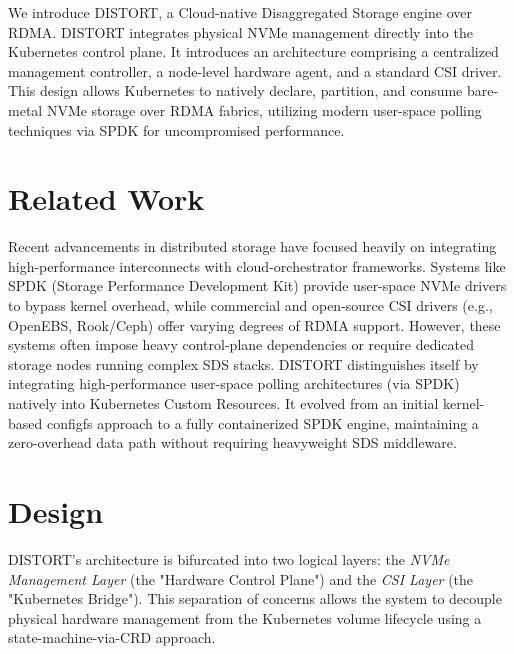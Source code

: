 \documentclass[sigconf]{acmart}
\begin{document}
We introduce DISTORT, a Cloud-native Disaggregated Storage engine over RDMA. DISTORT integrates physical NVMe management directly into the Kubernetes control plane. It introduces an architecture comprising a centralized management controller, a node-level hardware agent, and a standard CSI driver. This design allows Kubernetes to natively declare, partition, and consume bare-metal NVMe storage over RDMA fabrics, utilizing modern user-space polling techniques via SPDK for uncompromised performance.

\section{Related Work}
Recent advancements in distributed storage have focused heavily on integrating high-performance interconnects with cloud-orchestrator frameworks. Systems like SPDK (Storage Performance Development Kit) provide user-space NVMe drivers to bypass kernel overhead, while commercial and open-source CSI drivers (e.g., OpenEBS, Rook/Ceph) offer varying degrees of RDMA support. However, these systems often impose heavy control-plane dependencies or require dedicated storage nodes running complex SDS stacks. DISTORT distinguishes itself by integrating high-performance user-space polling architectures (via SPDK) natively into Kubernetes Custom Resources. It evolved from an initial kernel-based configfs approach to a fully containerized SPDK engine, maintaining a zero-overhead data path without requiring heavyweight SDS middleware.

\section{Design}
DISTORT's architecture is bifurcated into two logical layers: the \textit{NVMe Management Layer} (the "Hardware Control Plane") and the \textit{CSI Layer} (the "Kubernetes Bridge"). This separation of concerns allows the system to decouple physical hardware management from the Kubernetes volume lifecycle using a state-machine-via-CRD approach.
\end{document}
